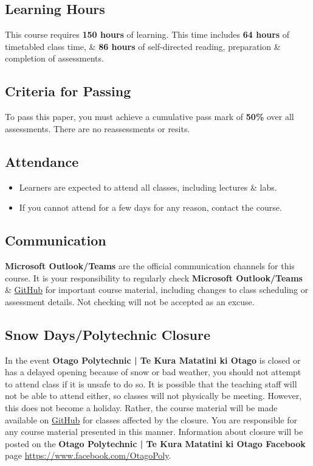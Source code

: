 \documentclass{article}
\begin{document}
\subsection*{Learning Hours}
This course requires \textbf{150 hours} of learning. This time includes \textbf{64 hours} of timetabled class time, \& \textbf{86 hours} of self-directed reading, preparation \& completion of assessments.

\subsection*{Criteria for Passing}
To pass this paper, you must achieve a cumulative pass mark of \textbf{50\%} over all assessments. There are no reassessments or resits. 

\subsection*{Attendance}
\begin{itemize}
	\item Learners are expected to attend all classes, including lectures \& labs.
	\item If you cannot attend for a few days for any reason, contact the course.
\end{itemize} 

\subsection*{Communication}
\textbf{Microsoft Outlook/Teams} are the official communication channels for this course. It is your responsibility to regularly check \textbf{Microsoft Outlook/Teams} \& \href{https://github.com/otago-polytechnic-bit-courses/ID511001-programming-2}{GitHub} for important course material, including changes to class scheduling or assessment details. Not checking will not be accepted as an excuse.

\subsection*{Snow Days/Polytechnic Closure}
In the event \textbf{Otago Polytechnic | Te Kura Matatini ki Otago} is closed or has a delayed opening because of snow or bad weather, you should not attempt to attend class if it is unsafe to do so. It is possible that the teaching staff will not be able to attend either, so classes will not physically be meeting. However, this does not become a holiday. Rather, the course material will be made available on \href{https://github.com/otago-polytechnic-bit-courses/ID511001-programming-2}{GitHub} for classes affected by the closure. You are responsible for any course material presented in this manner. Information about closure will be posted on the \textbf{Otago Polytechnic | Te Kura Matatini ki Otago Facebook} page \href{https://www.facebook.com/OtagoPoly}{https://www.facebook.com/OtagoPoly}.
\end{document}

